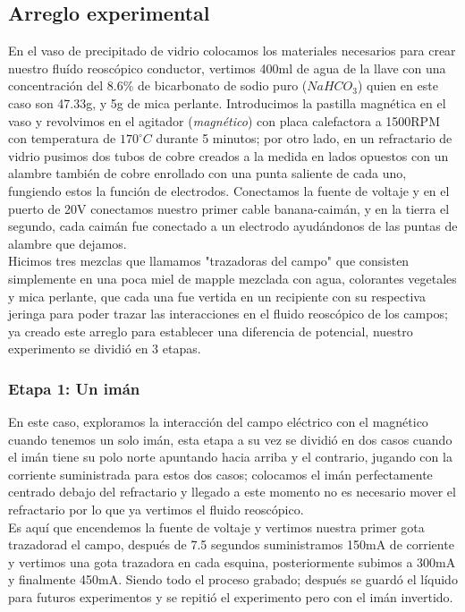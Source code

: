 \documentclass[article,12pt]{elsarticle}
\begin{document}
    \subsection{Arreglo experimental}

    En el vaso de precipitado de vidrio colocamos los materiales necesarios para crear nuestro fluído reoscópico conductor, vertimos 400ml de agua de la llave con una concentración del 8.6\% de bicarbonato de sodio puro ($NaHCO_3$) quien en este caso son 47.33g, y 5g de mica perlante. Introducimos la pastilla magnética en el vaso y revolvimos en el agitador (\textit{magnético}) con placa calefactora a 1500RPM con temperatura de $170^{\circ}C$ durante 5 minutos; por otro lado, en un refractario de vidrio pusimos dos tubos de cobre creados a la medida en lados opuestos con un alambre también de cobre enrollado con una punta saliente de cada uno, fungiendo estos la función de electrodos. Conectamos la fuente de voltaje y en el puerto de 20V conectamos nuestro primer cable banana-caimán, y en la tierra el segundo, cada caimán fue conectado a un electrodo ayudándonos de las puntas de alambre que dejamos.\\
    Hicimos tres mezclas que llamamos "trazadoras del campo" que consisten simplemente en una poca miel de mapple mezclada con agua, colorantes vegetales y mica perlante, que cada una fue vertida en un recipiente con su respectiva jeringa para poder trazar las interacciones en el fluido reoscópico de los campos; ya creado este arreglo para establecer una diferencia de potencial, nuestro experimento se dividió en 3 etapas.

    \subsubsection{Etapa 1: Un imán}

    En este caso, exploramos la interacción del campo eléctrico con el magnético cuando tenemos un solo imán, esta etapa a su vez se dividió en dos casos cuando el imán tiene su polo norte apuntando hacia arriba y el contrario, jugando con la corriente suministrada para estos dos casos; colocamos el imán perfectamente centrado debajo del refractario y llegado a este momento no es necesario mover el refractario por lo que ya vertimos el fluido reoscópico.\\
    Es aquí que encendemos la fuente de voltaje y vertimos nuestra primer gota trazadorad el campo, después de 7.5 segundos suministramos 150mA de corriente y vertimos una gota trazadora en cada esquina, posteriormente subimos a 300mA y finalmente 450mA. Siendo todo el proceso grabado; después se guardó el líquido para futuros experimentos y se repitió el experimento pero con el imán invertido.
\end{document}
